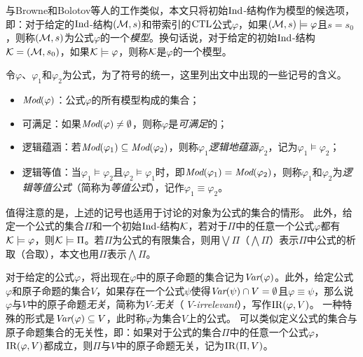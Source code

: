 与Browne和Bolotov等人的工作类似，本文只将初始$\textrm{Ind}$-结构作为模型的候选项\cite{browne1988characterizing,DBLP:journals/jetai/BolotovF99}，即：对于给定的$\textrm{Ind}$-结构$({\cal M},s)$和带索引的$\textrm{CTL}$公式$\varphi$，如果$({\cal M},s)\models \varphi$且$s = s_0$，则称$({\cal M},s)$为公式$\varphi$的一个\emph{模型}。换句话说，对于给定的初始$\textrm{Ind}$-结构${\cal K}=({\cal M},s_0)$，如果${\cal K} \models \varphi$，则称$\cal K$是$\varphi$的一个模型。


令$\varphi$、$\varphi_1$和$\varphi_2$为公式，为了符号的统一，这里列出文中出现的一些记号的含义。
\begin{itemize}
	\item $\textit{Mod}(\varphi)$：公式$\varphi$的所有模型构成的集合；
	\item 可满足：如果$\textit{Mod}(\varphi)\not = \emptyset$，则称$\varphi$是\emph{可满足}的；
	\item 逻辑蕴涵：若$\textit{Mod}(\varphi_1)\subseteq \textit{Mod}(\varphi_2)$，则称$\varphi_1$\emph{逻辑地蕴涵}$\varphi_2$，记为$\varphi_1\models \varphi_2$；
	\item 逻辑等值：当$\varphi_1\models \varphi_2$且$\varphi_2\models \varphi_1$时，即$\textit{Mod}(\varphi_1)= \textit{Mod}(\varphi_2)$，则称$\varphi_1$和$\varphi_2$为\emph{逻辑等值公式}（简称为\emph{等值公式}），记作$\varphi_1 \equiv \varphi_2$。
\end{itemize}


值得注意的是，上述的记号也适用于讨论的对象为公式的集合的情形。
此外，给定一个公式的集合$\Pi$和一个初始$\textrm{Ind}$-结构$\cal K$，若对于$\Pi$中的任意一个公式$\varphi$都有${\cal K} \models \varphi$，则${\cal K} \models \Pi$。若$\Pi$为公式的有限集合，则用$\bigvee \Pi$（$\bigwedge \Pi$）表示$\Pi$中公式的析取（合取），本文也用$\Pi$表示$\bigwedge \Pi$。

对于给定的公式$\varphi$，将出现在$\varphi$中的原子命题的集合记为$\textit{Var}(\varphi)$。此外，给定公式$\varphi$和原子命题的集合$V$，如果存在一个公式$\psi$使得$\textit{Var}(\psi) \cap V = \emptyset$且$\varphi \equiv \psi$，那么说$\varphi$与$V$中的原子命题\emph{无关}，简称为\emph{$V$-无关}（ \emph{$V$-irrelevant}），写作$\textrm{IR}(\varphi,V)$。
一种特殊的形式是$\textit{Var}(\varphi) \subseteq V$，此时称$\varphi$为集合$V$上的公式。
可以类似定义公式的集合与原子命题集合的无关性，即：如果对于公式的集合$\Pi$中的任意一个公式$\varphi$，$\textrm{IR}(\varphi,V)$都成立，则$\Pi$与$V$中的原子命题无关，记为$\textrm{IR}(\Pi,V)$。

